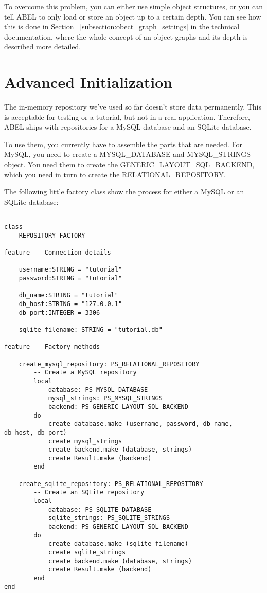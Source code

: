 To overcome this problem, you can either use simple object structures, or you can tell ABEL to only load or store an object up to a certain depth.
You can see how this is done in Section ~\ref{subsection:obect_graph_settings} in the technical documentation, where the whole concept of an object graphs and its depth is described more detailed.



\section{Advanced Initialization}
\label{section:advanced_initialization}

The in-memory repository we've used so far doesn't store data permanently.
This is acceptable for testing or a tutorial, but not in a real application.
Therefore, ABEL ships with repositories for a MySQL database and an SQLite database.

To use them, you currently have to assemble the parts that are needed.
For MySQL, you need to create a MYSQL\_DATABASE and MYSQL\_STRINGS object.
You need them to create the GENERIC\_LAYOUT\_SQL\_BACKEND, which you need in turn to create the RELATIONAL\_REPOSITORY.

The following little factory class show the process for either a MySQL or an SQLite \cite{SQLite} database:

\begin{lstlisting}[language=OOSC2Eiffel, captionpos=b, caption={}, label={lst:advanced_initialization}]

class 
	REPOSITORY_FACTORY

feature -- Connection details
	
	username:STRING = "tutorial"
	password:STRING = "tutorial"

	db_name:STRING = "tutorial"
	db_host:STRING = "127.0.0.1"
	db_port:INTEGER = 3306

	sqlite_filename: STRING = "tutorial.db"

feature -- Factory methods

	create_mysql_repository: PS_RELATIONAL_REPOSITORY
		-- Create a MySQL repository
		local
			database: PS_MYSQL_DATABASE
			mysql_strings: PS_MYSQL_STRINGS
			backend: PS_GENERIC_LAYOUT_SQL_BACKEND
		do
			create database.make (username, password, db_name, db_host, db_port)
			create mysql_strings
			create backend.make (database, strings)
			create Result.make (backend)
		end

	create_sqlite_repository: PS_RELATIONAL_REPOSITORY
		-- Create an SQLite repository
		local
			database: PS_SQLITE_DATABASE
			sqlite_strings: PS_SQLITE_STRINGS
			backend: PS_GENERIC_LAYOUT_SQL_BACKEND
		do
			create database.make (sqlite_filename)
			create sqlite_strings
			create backend.make (database, strings)
			create Result.make (backend)
		end
end	

\end{lstlisting}


